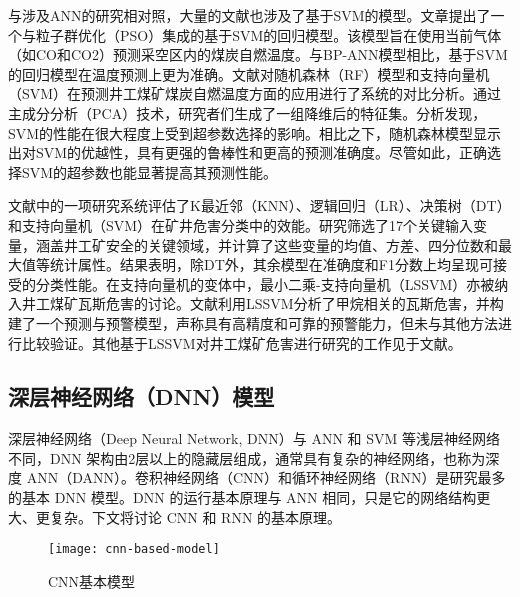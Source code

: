 \documentclass[lang=cn,a4paper,citestyle=gb7714-2015, bibstyle=gb7714-2015]{elegantpaper}
\newcommand{\mycite}[1]{\textsuperscript{\parencite{#1}}}
\begin{document}
    与涉及ANN的研究相对照，大量的文献也涉及了基于SVM的模型。文章\mycite{Deng2018}提出了一个与粒子群优化（PSO）集成的基于SVM的回归模型。该模型旨在使用当前气体（如CO和CO2）预测采空区内的煤炭自燃温度。与BP-ANN模型相比，基于SVM的回归模型在温度预测上更为准确。文献\mycite{Lei2019}对随机森林（RF）模型和支持向量机（SVM）在预测井工煤矿煤炭自燃温度方面的应用进行了系统的对比分析。通过主成分分析（PCA）技术，研究者们生成了一组降维后的特征集。分析发现，SVM的性能在很大程度上受到超参数选择的影响。相比之下，随机森林模型显示出对SVM的优越性，具有更强的鲁棒性和更高的预测准确度。尽管如此，正确选择SVM的超参数也能显著提高其预测性能。

    文献\mycite{Tripathy2021}中的一项研究系统评估了K最近邻（KNN）、逻辑回归（LR）、决策树（DT）和支持向量机（SVM）在矿井危害分类中的效能。研究筛选了17个关键输入变量，涵盖井工矿安全的关键领域，并计算了这些变量的均值、方差、四分位数和最大值等统计属性。结果表明，除DT外，其余模型在准确度和F1分数上均呈现可接受的分类性能。在支持向量机的变体中，最小二乘-支持向量机（LSSVM）亦被纳入井工煤矿瓦斯危害的讨论。文献\mycite{Cao2008}利用LSSVM分析了甲烷相关的瓦斯危害，并构建了一个预测与预警模型，声称具有高精度和可靠的预警能力，但未与其他方法进行比较验证。其他基于LSSVM对井工煤矿危害进行研究的工作见于文献\mycite{Chou2016}\mycite{Yang2013}\mycite{Zhao2009}。

    \subsection{深层神经网络（DNN）模型}
    深层神经网络（Deep Neural Network, DNN）与 ANN 和 SVM 等浅层神经网络不同，DNN 架构由2层以上的隐藏层组成，通常具有复杂的神经网络，也称为深度 ANN（DANN）。卷积神经网络（CNN）和循环神经网络（RNN）是研究最多的基本 DNN 模型。DNN 的运行基本原理与 ANN 相同，只是它的网络结构更大、更复杂。下文将讨论 CNN 和 RNN 的基本原理。

    \begin{figure}[!h]
        \centering
        \texttt{[image: cnn-based-model]}
        \caption{CNN基本模型}
        \label{fig:cnn-based-model}
    \end{figure}
\end{document}
